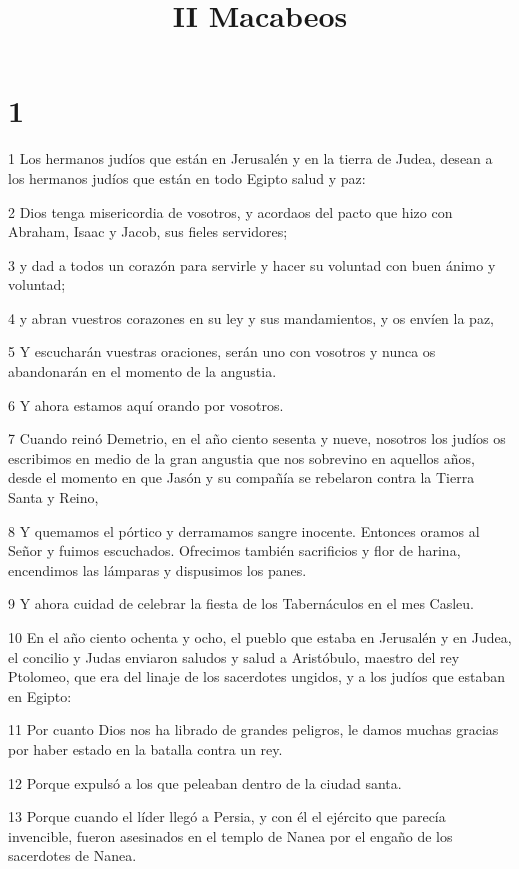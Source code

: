 

\title{II Macabeos}


\chapter{1}

\par 1 Los hermanos judíos que están en Jerusalén y en la tierra de Judea, desean a los hermanos judíos que están en todo Egipto salud y paz:
\par 2 Dios tenga misericordia de vosotros, y acordaos del pacto que hizo con Abraham, Isaac y Jacob, sus fieles servidores;
\par 3 y dad a todos un corazón para servirle y hacer su voluntad con buen ánimo y voluntad;
\par 4 y abran vuestros corazones en su ley y sus mandamientos, y os envíen la paz,
\par 5 Y escucharán vuestras oraciones, serán uno con vosotros y nunca os abandonarán en el momento de la angustia.
\par 6 Y ahora estamos aquí orando por vosotros.
\par 7 Cuando reinó Demetrio, en el año ciento sesenta y nueve, nosotros los judíos os escribimos en medio de la gran angustia que nos sobrevino en aquellos años, desde el momento en que Jasón y su compañía se rebelaron contra la Tierra Santa y Reino,
\par 8 Y quemamos el pórtico y derramamos sangre inocente. Entonces oramos al Señor y fuimos escuchados. Ofrecimos también sacrificios y flor de harina, encendimos las lámparas y dispusimos los panes.
\par 9 Y ahora cuidad de celebrar la fiesta de los Tabernáculos en el mes Casleu.
\par 10 En el año ciento ochenta y ocho, el pueblo que estaba en Jerusalén y en Judea, el concilio y Judas enviaron saludos y salud a Aristóbulo, maestro del rey Ptolomeo, que era del linaje de los sacerdotes ungidos, y a los judíos que estaban en Egipto:
\par 11 Por cuanto Dios nos ha librado de grandes peligros, le damos muchas gracias por haber estado en la batalla contra un rey.
\par 12 Porque expulsó a los que peleaban dentro de la ciudad santa.
\par 13 Porque cuando el líder llegó a Persia, y con él el ejército que parecía invencible, fueron asesinados en el templo de Nanea por el engaño de los sacerdotes de Nanea.
